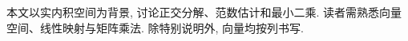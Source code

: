 \frontmatter
\thispagestyle{cover}
\vspace*{3.60pt}
\begin{center}
{\fontsize{17.28}{26}\selectfont \BookTitle\par}
\ifdefempty{\BookAuthor}{}{\vspace{5.4pt}{\fontsize{12}{20}\selectfont \BookAuthor\par}}
\ifdefempty{\BookDate}{}{\vspace{2pt}{\fontsize{12}{20}\selectfont \BookDate\par}}
\end{center}
\originalpreface
本文以实内积空间为背景, 讨论正交分解、范数估计和最小二乘.
读者需熟悉向量空间、线性映射与矩阵乘法. 除特别说明外, 向量均按列书写.
\originalcontents
\mainmatter


